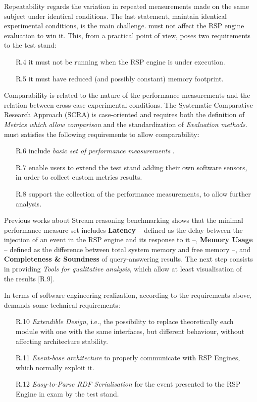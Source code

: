Repeatability regards the variation in repeated measurements made on the same subject under identical conditions. The last statement, maintain identical experimental conditions, is the main challenge. \name must not affect the RSP engine evaluation to win it. This, from a practical point of view, poses two requirements to the test stand:
\begin{enumerate}
\item[R.4] it must not be running when the RSP engine is under execution. %
\item[R.5] it must have reduced (and possibly constant) memory footprint. %
\end{enumerate}

Comparability is related to the nature of the performance measurements and the relation between cross-case experimental conditions. The Systematic Comparative Research Approach (SCRA) is case-oriented and requires both the definition of \textit{Metrics which allow comparison} and the standardization of \textit{Evaluation methods}. \name must satisfies the following requirements to allow comparability:
\begin{enumerate}
\item[R.6] include \textit{basic set of performance measurements} \cite{DBLP:conf/esws/ScharrenbachUMVB13}.
\item[R.7] enable users to extend the test stand adding their own software sensors, in order to collect custom metrics results.
\item[R.8] support the collection of the performance measurements, to allow further analysis.
\end{enumerate}

Previous works about Stream reasoning benchmarking shows that the minimal performance measure set includes \textbf{Latency} -- defined as the delay between the injection of an event in the RSP engine and its response to it --, \textbf{Memory Usage} -- defined as the difference between total system memory and free memory --, and \textbf{Completeness \& Soundness} of query-answering results. 
The next step consists in providing \textit{Tools for qualitative analysis}, which allow at least visualisation of the results [R.9].


In terms of software engineering \name realization, according to the requirements above, demands some technical requirements: 
\begin{enumerate}
\item[R.10] \textit{Extendible Design}, i.e.,  the possibility to replace theoretically each module with one with the same interfaces, but different behaviour, without affecting architecture stability.
\item[R.11] \textit{Event-base architecture} to properly communicate with  RSP Engines, which normally exploit it.
\item[R.12] \textit{Easy-to-Parse RDF Serialisation} for the event presented to the RSP Engine in exam by the test stand.
\end{enumerate}

